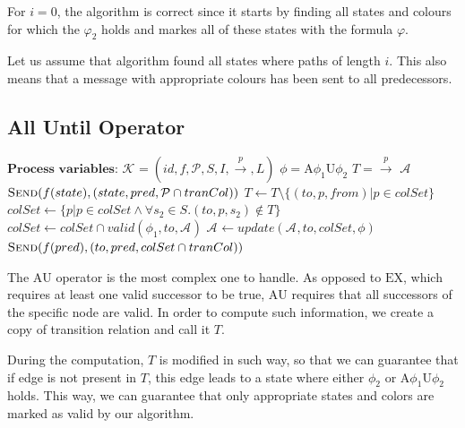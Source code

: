 \documentclass[12pt,oneside,draft]{fithesis2}
\newcommand{\as}[1][]{\ensuremath{\mathcal{A}_{#1}}}
\newcommand{\ks}[1][]{\ensuremath{\mathcal{K}_{#1}}}
\newcommand{\trans}[1]{\stackrel{#1}{\rightarrow}}
\newcommand{\au}[2]{\ensuremath{\mbox{A} #1 \mbox{U} #2 }}
\newcommand{\ex}[1]{\ensuremath{\mbox{EX} #1}}
\begin{document}
				For $i=0$, the algorithm is correct since it starts by finding all states and colours for which the $\varphi_2$ holds and markes all of these states with the formula $\varphi$.
				
				Let us assume that algorithm found all states where paths of length $i$. This also means that a message with appropriate colours has been sent to all predecessors. 
			
		    \subsection{All Until Operator}
				\begin{algorithmic}[1]
				\State $ \textbf{Process variables:} $
				\State $ \ks = (id, f, \mathcal{P}, S, I, \trans{p}, L) $ 
				\State $ \phi = \au{\phi_1}{\phi_2}  $ 
				\State $ T = \trans{p} $ 
				\State $ \as $ 
							\State $ \Call{Send}{f(state), (state, pred, \mathcal{P} \cap tranCol)} $
						\EndFor
					\EndFor
				\EndProcedure
					\State $ T \gets T \setminus \{ (to, p, from) | p \in colSet \} $
					\State $ colSet \gets \{ p | p \in colSet \wedge \forall s_2 \in S. (to, p, s_2) \notin T \} $
					\State $ colSet \gets colSet \cap valid(\phi_1, to, \as)$
					\If{$ colSet \neq \emptyset $ \textbf{and} $ colSet \setminus valid(\phi, to, \as) \neq \emptyset $}
						\State $ \as \gets update(\as, to, colSet, \phi) $
							\State $ \Call{Send}{f(pred), (to, pred, colSet \cap tranCol)} $
						\EndFor
					\EndIf
				\EndProcedure
				\end{algorithmic}	
				
				The \au{}{} operator is the most complex one to handle. As opposed to \ex{}{}, which requires at least one valid successor to be true, \au{}{} requires that all successors of the specific node are valid. In order to compute such information, we create a copy of transition relation and call it $T$. 
				
				During the computation, $T$ is modified in such way, so that we can guarantee that if edge is not present in $T$, this edge leads to a state where either $\phi_2$ or \au{\phi_1}{\phi_2} holds. This way, we can guarantee that only appropriate states and colors are marked as valid by our algorithm.
				
\end{document}
